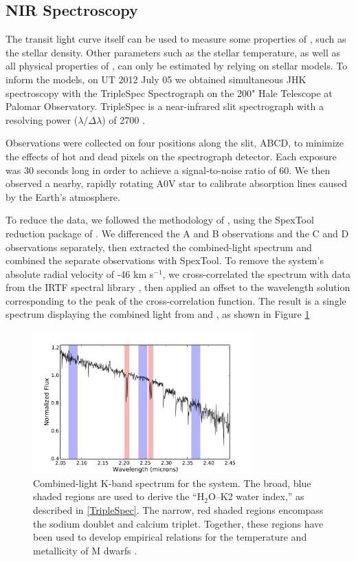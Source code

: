 \subsection{NIR Spectroscopy}

The transit light curve itself can be used to measure some properties of \LA, such as the stellar density.
Other parameters such as the stellar temperature, as well as all physical properties of \LB, can only be estimated by relying on stellar models. 
To inform the models, on UT 2012 July 05 we obtained simultaneous JHK spectroscopy with the TripleSpec Spectrograph on the 200" Hale Telescope at Palomar Observatory. 
TripleSpec is a near-infrared slit spectrograph with a resolving power ($\lambda / \Delta \lambda$) of 2700 \citep{Wilson04, Herter08}. 

Observations were collected on four positions along the slit, ABCD, to minimize the effects of hot and dead pixels on the spectrograph detector. 
Each exposure was 30 seconds long in order to achieve a signal-to-noise ratio of 60.
We then observed a nearby, rapidly rotating A0V star to calibrate absorption lines caused by the Earth's atmosphere.

To reduce the data, we followed the methodology of \citet{Muirhead14}, using the SpexTool reduction package of \citet{Cushing04}. 
We differenced the A and B observations and the C and D observations separately, then extracted the combined-light spectrum and combined the separate observations with SpexTool. 
To remove the system's absolute radial velocity of -46 km s$^{-1}$, we cross-correlated the spectrum with data from the IRTF spectral library \citep{Cushing05, Rayner09}, then applied an offset to the wavelength solution corresponding to the peak of the cross-correlation function. 
The result is a single spectrum displaying the combined light from \LA{} and \LB, as shown in Figure \ref{TripleSpecPlot}

\begin{figure}[htbp!]
\centerline{\includegraphics[width=0.75\textwidth]{chapter4/f2.pdf}}
\caption[Combined-light K-band spectrum for the \LHS{} system]{Combined-light K-band spectrum for the \LHS{} system.
The broad, blue shaded regions are used to derive the ``H$_2$O--K2 water index,'' as described in \textsection\ref{TripleSpec}.
The narrow, red shaded regions encompass the sodium doublet and calcium triplet.
Together, these regions have been used to develop empirical relations for the temperature and metallicity of M dwarfs \citep{RojasAyala12}.
  }
\label{TripleSpecPlot}
\end{figure}




